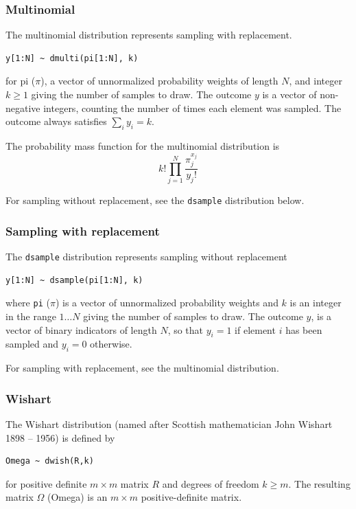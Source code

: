 \documentclass[11pt, a4paper, titlepage]{report}
\begin{document}
\subsubsection{Multinomial}
\label{bugs:dmulti}

The multinomial distribution represents sampling with replacement. 
\begin{verbatim}
y[1:N] ~ dmulti(pi[1:N], k)
\end{verbatim}
for pi ($\pi$), a vector of unnormalized probability weights of length $N$,
and integer $k \geq 1$ giving the number of samples to draw. The outcome
$y$ is a vector of non-negative integers, counting the number of times
each element was sampled. The outcome always satisfies $\sum_i y_i = k$.

The probability mass function for the multinomial distribution is
\[
k! \prod_{j=1}^N
\frac{\textstyle \pi_j^{x_j}}{\textstyle y_j!}
\]

For sampling without replacement, see the \texttt{dsample}
distribution below.
      

\subsubsection{Sampling with replacement}
\label{bugs:dsample}

The \texttt{dsample} distribution represents sampling without replacement
\begin{verbatim}
y[1:N] ~ dsample(pi[1:N], k)
\end{verbatim}
where \texttt{pi} ($\pi$) is a vector of unnormalized probability
weights and $k$ is an integer in the range $1 \ldots N$ giving the
number of samples to draw. The outcome $y$, is a vector of binary
indicators of length $N$, so that $y_i = 1$ if element $i$ has been
sampled and $y_i = 0$ otherwise.

For sampling with replacement, see the multinomial distribution.

\subsubsection{Wishart}
\label{bugs:dwishart}

The Wishart distribution (named after Scottish mathematician John
Wishart 1898 -- 1956) is defined by
\begin{verbatim}
Omega ~ dwish(R,k)
\end{verbatim}
for positive definite $m \times m$ matrix $R$ and degrees of freedom
$k \geq m$. The resulting matrix $\Omega$ (Omega) is an $m \times m$
positive-definite matrix.
\end{document}
